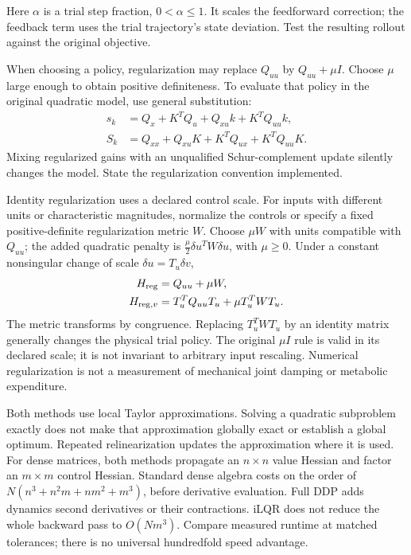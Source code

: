 Here $\alpha$ is a trial step fraction, $0<\alpha\le1$. It scales the
feedforward correction; the feedback term uses the trial trajectory's state
deviation. Test the resulting rollout against the original objective.

When choosing a policy, regularization may replace $Q_{uu}$ by $Q_{uu}+\mu I$.
Choose $\mu$ large enough to obtain positive definiteness. To evaluate that
policy in the original quadratic model, use general substitution:
\begin{align}
s_k&=Q_x+K^TQ_u+Q_{xu}k+K^TQ_{uu}k,\\
S_k&=Q_{xx}+Q_{xu}K+K^TQ_{ux}+K^TQ_{uu}K.
\end{align}
Mixing regularized gains with an unqualified Schur-complement update silently
changes the model. State the regularization convention implemented.

Identity regularization uses a declared control scale. For inputs with
different units or characteristic magnitudes, normalize the controls or specify
a fixed positive-definite regularization metric $W$. Choose $\mu W$ with units
compatible with $Q_{uu}$; the added quadratic penalty is
$\tfrac{\mu}{2}\delta u^TW\delta u$, with $\mu\ge0$.
Under a constant nonsingular change of scale $\delta u=T_u\delta v$,
\begin{equation}
\begin{aligned}
H_{\rm reg}&=Q_{uu}+\mu W,\\
H_{{\rm reg},v}&=T_u^TQ_{uu}T_u+\mu T_u^TWT_u.
\end{aligned}
\label{eq:ch5:regularization-scale}
\end{equation}
The metric transforms by congruence. Replacing $T_u^TWT_u$ by an identity
matrix generally changes the physical trial policy. The original $\mu I$
rule is valid in its declared scale; it is not invariant to arbitrary input
rescaling. Numerical regularization is not a measurement of mechanical joint
damping or metabolic expenditure.

Both methods use local Taylor approximations. Solving a quadratic subproblem
exactly does not make that approximation globally exact or establish a global
optimum. Repeated relinearization updates the approximation where it is used.
For dense matrices, both methods propagate an $n\times n$ value Hessian and
factor an $m\times m$ control Hessian. Standard dense algebra costs on the
order of $N(n^3+n^2m+nm^2+m^3)$, before derivative evaluation. Full DDP adds
dynamics second derivatives or their contractions. iLQR does not reduce the
whole backward pass to $O(Nm^3)$. Compare measured runtime at matched
tolerances; there is no universal hundredfold speed advantage.

